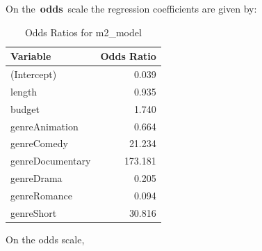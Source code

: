 \documentclass[
  letterpaper,
  DIV=11,
  numbers=noendperiod]{scrartcl}
\begin{document}
On the~\textbf{odds}~scale the regression coefficients are given by:

\hypertarget{tbl-odds-Summary}{}
\begin{longtable}{lr}
\caption{\label{tbl-odds-Summary}Odds Ratios for m2\_model }\tabularnewline

\toprule
Variable & Odds Ratio \\ 
\midrule\addlinespace[2.5pt]
(Intercept) & 0.039 \\ 
length & 0.935 \\ 
budget & 1.740 \\ 
genreAnimation & 0.664 \\ 
genreComedy & 21.234 \\ 
genreDocumentary & 173.181 \\ 
genreDrama & 0.205 \\ 
genreRomance & 0.094 \\ 
genreShort & 30.816 \\ 
\bottomrule
\end{longtable}

On the odds scale,
\end{document}

